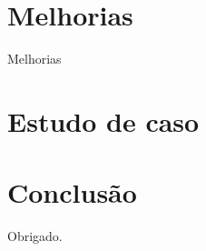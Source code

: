 \documentclass{beamer}
\begin{document}
   \section{Melhorias}
   \begin{frame}{Melhorias}

   \end{frame}
   \section{Estudo de caso}
   \begin{frame}
   \end{frame}

   \section{Conclusão}
   \begin{frame}
      \begin{center}
         Obrigado.
      \end{center}
   \end{frame}
\end{document}
